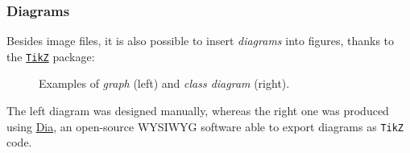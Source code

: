 \documentclass[10pt,    %
    english,            %
    xcolor=table,       %
    envcountsect,       %
    aspectratio=43      %
]{beamer}
\begin{document}
\begin{frame}
    \label{sli:Diagrams}
    \frametitle{Diagrams}
    
    Besides image files, it is also possible to insert \textit{diagrams} into figures, thanks to the \href{https://ctan.org/pkg/pgf?lang=en}{\texttt{TikZ}} package:
    
    \vspace{-0.20cm}
    \begin{figure}[H]
        \centering
        \resizebox{0.35\linewidth}{!}{}
        \hspace{0.25cm}\hspace{0.25cm}
        \resizebox{0.45\linewidth}{!}{}
        \vspace{-0.10cm}
        \caption{Examples of \textit{graph} (left) and \textit{class diagram} (right).}
        \label{fig:diagrams}
    \end{figure}
    
    \vspace{-0.50cm}
    The left diagram was designed manually, whereas the right one was produced using \href{http://dia-installer.de}{Dia}, an open-source WYSIWYG software able to export diagrams as \texttt{TikZ} code.
    
    
\end{frame}
    
\end{document}

